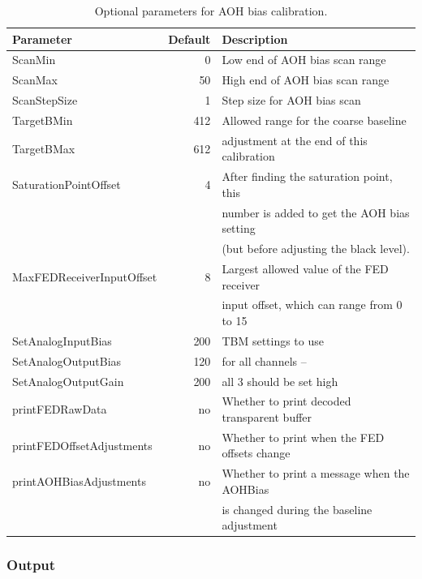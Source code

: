 \begin{table}
\centering
\caption{Optional parameters for AOH bias calibration.}
\label{tab:AOHBiasParameters}
\begin{tabular}{l@{~~~~}r@{~~~~}l}
\hline
\hline
Parameter & Default & Description \\
\hline
ScanMin                     &   0 & Low end of AOH bias scan range \\
ScanMax                     &  50 & High end of AOH bias scan range \\
ScanStepSize                &   1 & Step size for AOH bias scan \\
TargetBMin                  & 412 & Allowed range for the coarse baseline \\
TargetBMax                  & 612 & adjustment at the end of this calibration \\
SaturationPointOffset       &   4 & After finding the saturation point, this \\
                            &     & number is added to get the AOH bias setting \\
                            &     & (but before adjusting the black level). \\
MaxFEDReceiverInputOffset   &   8 & Largest allowed value of the FED receiver \\
                            &     & input offset, which can range from 0 to 15 \\
SetAnalogInputBias          & 200 & TBM settings to use \\
SetAnalogOutputBias         & 120 & for all channels -- \\
SetAnalogOutputGain         & 200 & all 3 should be set high \\
printFEDRawData             &  no & Whether to print decoded transparent buffer \\
printFEDOffsetAdjustments   &  no & Whether to print when the FED offsets change \\
printAOHBiasAdjustments     &  no & Whether to print a message when the AOHBias \\
                            &     & is changed during the baseline adjustment \\
\hline
\hline
\end{tabular}
\end{table}

\subsubsection{Output}
